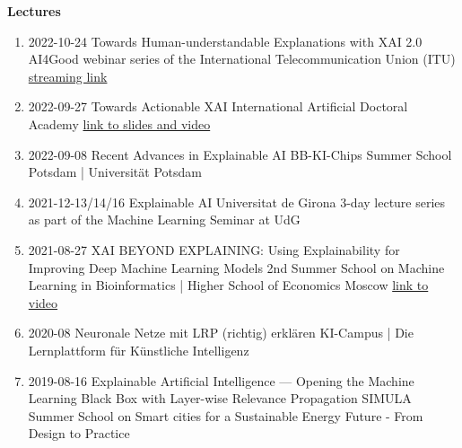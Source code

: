 \documentclass[10pt,a4paper]{article} %
\begin{document}
\headedsection
{\bf Lectures}{}
{
\begin{enumerate}
    \item {}
                    {2022-10-24}
                    {Towards Human-understandable Explanations with XAI 2.0}
                    {AI4Good webinar series of the International Telecommunication Union (ITU)}
                    {\href{https://www.youtube.com/watch?v=NiE13aBBx28}{streaming link}}
    \item {}
                    {2022-09-27}
                    {Towards Actionable XAI}
                    {International Artificial Doctoral Academy}
                    {\href{https://www.i-aida.org/events/towards-actionable-xai-2/}{link to slides and video}}
    \item {}
                    {2022-09-08}
                    {Recent Advances in Explainable AI}
                    {BB-KI-Chips Summer School Potsdam | Universität Potsdam}
    \item {}
                    {2021-12-13/14/16}
                    {Explainable AI}
                    {Universitat de Girona}
                    {3-day lecture series as part of the Machine Learning Seminar at UdG}
    \item {}
                    {2021-08-27}
                    {XAI BEYOND EXPLAINING: Using Explainability for Improving Deep Machine Learning Models}
                    {2nd Summer School on Machine Learning in Bioinformatics | Higher School of Economics Moscow}
                    {\href{https://www.youtube.com/watch?v=fHBSLzJ4zbA}{link to video}}
    \item {}
                    {2020-08}
                    {Neuronale Netze mit LRP (richtig) erklären}
                    {KI-Campus | Die Lernplattform für Künstliche Intelligenz}
    \item {}
                    {2019-08-16}
                    {Explainable Artificial Intelligence --- Opening the Machine Learning Black Box with Layer-wise Relevance Propagation}
                    {SIMULA Summer School on Smart cities for a Sustainable Energy Future - From Design to Practice}
\end{enumerate}
}
\end{document}
